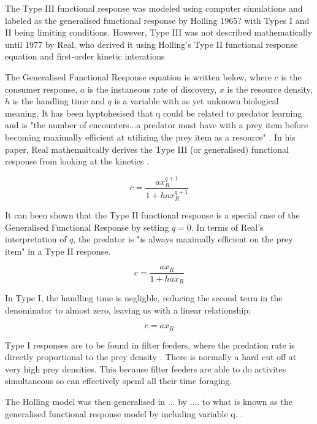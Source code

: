 \documentclass[11pt, a4paper, titlepage]{article}
\begin{document}
The Type III functional response was modeled using computer simulations and labeled as the generalised functional response by Holling 1965? \parencite{Holling1965} with Types I and II being limiting conditions. However, Type III was not described mathematically until 1977 by Real, who derived it using Holling's Type II functional response equation and first-order kinetic interations \parencite{Real1977}
 
The Generalised Functional Response equation is written below, where $c$ is the consumer response, $a$ is the instaneous rate of discovery, $x$ is the resource density, $h$ is the handling time and $q$ is a variable with as yet unknown biological meaning. It has been hyptohesised that q could be related to predator learning and is "the number of encounters...a predator must have with a prey item before becoming maximally efficient at utilizing the prey item as a resource" \parencite{Real1977}. In his paper, Real mathemaitcally derives the Type III (or generalised) functional response from looking at the kinetics \parencite{Real1977}.

\begin{equation}
c = \frac{ax_R^{q + 1}}{1 + hax_R^{q + 1}}
\end{equation}

It can been shown that the Type II functional response is a special case of the Generalised Functional Response by setting $q = 0$. In terms of Real's interpretation of $q$, the predator is "is always maximally efficient on the prey item"  \parencite{Real1977} in a Type II response.

\begin{equation}
c = \frac{ax_R}{1 + hax_R}
\end{equation}

 In Type I, the handling time is negligble, reducing the second term in the denominator to almost zero, leaving us with a linear relationship:

\begin{equation}
c = ax_R
\end{equation}

Type I responses are to be found in filter feeders, where the predation rate is directly  proportional to the prey density \parencite{Jeschke2004}. There is normally a hard cut off at very high prey densities. This because filter feeders are able to do activites simultaneous so can effectively spend all their time foraging.

The Holling model was then generalised in ... 
by .... to what is known as the generalised functional response model by including variable q. . 
\end{document}
